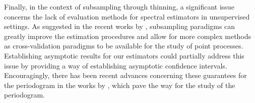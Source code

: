 Finally, in the context of subsampling through thinning, a significant issue concerns the lack of evaluation methods for spectral estimators in unsupervised settings.
As suggested in the recent works by \textcite{Cronie2024, Coeurjolly2024}, subsampling paradigms can greatly improve the estimation procedures and allow for more complex methods as cross-validation paradigms to be available for the study of point processes. 
Establishing asymptotic results for our estimators could partially address this issue by providing a way of establishing asymptotic confidence intervals. Encouragingly, there has been recent advances concerning these guarantees for the periodogram in the works by \textcite{Rajala2023, Yang2024}, which pave the way for the study of the periodogram.

